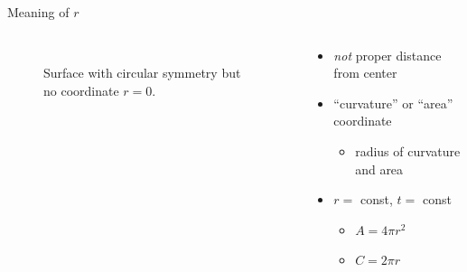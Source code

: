 \documentclass{beamer}
\begin{document}

\begin{frame}{Meaning of $r$}

\begin{columns}[c]
  \begin{column}{0.3\textwidth}
    \begin{figure}[ht]
      \centering
      \caption{\\Surface with circular symmetry but no coordinate $r = 0$.}
    \end{figure}
  \end{column}

  \begin{column}{0.6\textwidth}
    \begin{itemize}
    \setlength\itemsep{24pt}
    \item<+-> \emph{not} proper distance from center
    \item<+-> ``curvature'' or ``area'' coordinate
      \begin{itemize}
      \item radius of curvature and area
      \end{itemize}
    \item<+-> $r =$ const, $t =$ const
      \begin{itemize}
      \item $A = 4 \pi r^2$
      \item $C = 2 \pi r$
      \end{itemize}
    \end{itemize}
  \end{column}
\end{columns}


\end{frame}
\end{document}
